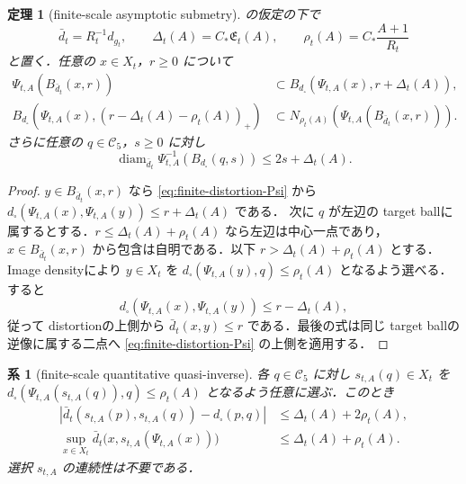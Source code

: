 \documentclass[a4paper,11pt]{ltjsarticle}
\numberwithin{equation}{section}
\theoremstyle{plain}
\newtheorem{theorem}{定理}[section]
\newtheorem{corollary}[corollary]{系}
\theoremstyle{definition}
\theoremstyle{remark}
\newcommand{\cC}{\mathcal C}
\newcommand{\diam}{\operatorname{diam}}
\begin{document}
\begin{theorem}[finite-scale asymptotic submetry]\label{thm:finite-scale-submetry}
 の仮定の下で
\[
 \bar d_t=R_t^{-1}d_{g_t},\qquad
 \Delta_t(A)=C_*\mathfrak E_t(A),\qquad
 \rho_t(A)=C_*\frac{A+1}{R_t}
\]
と置く．任意の $x\in X_t$，$r\ge0$ について
\begin{align}
 \Psi_{t,A}(B_{\bar d_t}(x,r))
 &\subset B_{d_\square}(\Psi_{t,A}(x),r+\Delta_t(A)),\label{eq:finite-submetry-upper}\\
 B_{d_\square}(\Psi_{t,A}(x),(r-\Delta_t(A)-\rho_t(A))_+)
 &\subset N_{\rho_t(A)}\!\left(\Psi_{t,A}(B_{\bar d_t}(x,r))\right).
 \label{eq:finite-submetry-lower}
\end{align}
さらに任意の $q\in\cC_5$，$s\ge0$ に対し
\begin{equation}\label{eq:finite-fibre-ball-collapse}
 \diam_{\bar d_t}\Psi_{t,A}^{-1}(B_{d_\square}(q,s))
 \le2s+\Delta_t(A).
\end{equation}
\end{theorem}

\begin{proof}
$y\in B_{\bar d_t}(x,r)$ なら \cref{eq:finite-distortion-Psi} から
$d_\square(\Psi_{t,A}(x),\Psi_{t,A}(y))\le r+\Delta_t(A)$ である．
次に $q$ が左辺の target ballに属するとする．$r\le\Delta_t(A)+\rho_t(A)$ なら左辺は中心一点であり，
$x\in B_{\bar d_t}(x,r)$ から包含は自明である．以下 $r>\Delta_t(A)+\rho_t(A)$ とする．Image densityにより $y\in X_t$ を
$d_\square(\Psi_{t,A}(y),q)\le\rho_t(A)$ となるよう選べる．すると
\[
 d_\square(\Psi_{t,A}(x),\Psi_{t,A}(y))\le r-\Delta_t(A),
\]
従って distortionの上側から $\bar d_t(x,y)\le r$ である．最後の式は同じ target ballの逆像に属する二点へ
\cref{eq:finite-distortion-Psi} の上側を適用する．
\end{proof}

\begin{corollary}[finite-scale quantitative quasi-inverse]\label{cor:finite-quasi-inverse}
各 $q\in\cC_5$ に対し $s_{t,A}(q)\in X_t$ を
$d_\square(\Psi_{t,A}(s_{t,A}(q)),q)\le\rho_t(A)$ となるよう任意に選ぶ．このとき
\begin{align}
 \left|\bar d_t(s_{t,A}(p),s_{t,A}(q))-d_\square(p,q)\right|
 &\le\Delta_t(A)+2\rho_t(A),\label{eq:finite-quasi-inverse-dist}\\
 \sup_{x\in X_t}\bar d_t\bigl(x,s_{t,A}(\Psi_{t,A}(x))\bigr)
 &\le\Delta_t(A)+\rho_t(A).\label{eq:finite-quasi-inverse-section}
\end{align}
選択 $s_{t,A}$ の連続性は不要である．
\end{corollary}
\end{document}
